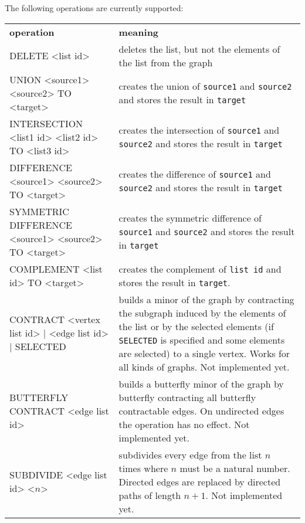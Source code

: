 The following operations are currently supported:
\\\begin{tcolorbox}[colback=lightpink]
  \begin{tabular}[H]{p{7cm}|p{8cm}}
    \textbf{operation}    & \textbf{meaning}\\
    DELETE <list id> & deletes the list, but not the elements of the list from the graph\\

    UNION <source1> <source2> TO <target> & creates the union of \texttt{source1} and \texttt{source2} and stores the result in \texttt{target}\\

    INTERSECTION <list1 id> <list2 id> TO <list3 id> &creates the intersection of \texttt{source1} and \texttt{source2} and stores the result in \texttt{target}\\
    
    DIFFERENCE <source1> <source2> TO <target> & creates the difference of \texttt{source1} and \texttt{source2} and stores the result in \texttt{target}\\
    
    SYMMETRIC DIFFERENCE <source1> <source2> TO <target>  & creates the symmetric difference of \texttt{source1} and \texttt{source2} and stores the result in \texttt{target}\\
    
    COMPLEMENT <list id> TO <target>  & creates the complement of \texttt{list id} and stores the result in \texttt{target}.\\
    
    CONTRACT <vertex list id> | <edge list id> | SELECTED & builds a minor of the graph by contracting the subgraph induced by the elements of the list or by the selected elements (if \texttt{SELECTED} is specified and some elements are selected) to a single vertex. Works for all kinds of graphs. Not implemented yet.\\
    BUTTERFLY CONTRACT <edge list id> & builds a butterfly minor of the graph by butterfly contracting all butterfly contractable edges. On undirected edges the operation has no effect. Not implemented yet.\\

    SUBDIVIDE <edge list id> <$n$> & subdivides every edge from the list $n$ times where $n$ must be a natural number. Directed edges are replaced by directed paths of length $n+1$. Not implemented yet.
  \end{tabular}
\end{tcolorbox}

